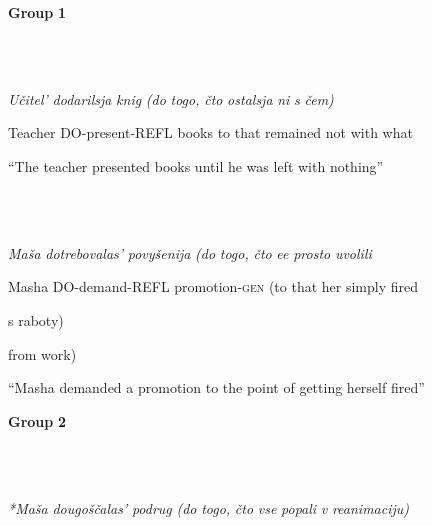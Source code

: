 \documentclass[output=paper,modfonts, nonflat]{langsci/langscibook}
\begin{document}
\textbf{Group} \textbf{1}

\begin{styleinnerExample}
\ea%
    \label{ex:key:29}
    \gll\\
        \\
    \glt
    \z

          \textit{Učitel’}  \textit{dodarilsja}               \textit{knig}   \textit{(do} \textit{togo,} \textit{čto} \textit{ostalsja}   \textit{ni}   \textit{s}      \textit{čem)}
\end{styleinnerExample}

\begin{styleinnerExample}
  Teacher DO-present-\textsc{REFL} books to  that         remained not with what
\end{styleinnerExample}

\begin{styleinnerExample}
  “The teacher presented books until he was left with nothing”
\end{styleinnerExample}

\begin{styleinnerExample}
\ea%
    \label{ex:key:30}
    \gll\\
        \\
    \glt
    \z

          \textit{Maša}   \textit{dotrebovalas’}          \textit{povyšenija}        \textit{(do} \textit{togo,} \textit{čto} \textit{ee} \textit{prosto} \textit{uvolili} 
\end{styleinnerExample}

\begin{styleinnerExample}
  Masha DO-demand-REFL promotion-\textsc{gen} (to  that          her simply fired 
\end{styleinnerExample}

\begin{styleinnerExample}
  s       raboty)
\end{styleinnerExample}

\begin{styleinnerExample}
  from work)
\end{styleinnerExample}

\begin{styleinnerExample}
  “Masha demanded a promotion to the point of getting herself fired” 
\end{styleinnerExample}

\textbf{Group} \textbf{2}

\begin{styleinnerExample}
\ea%
    \label{ex:key:31}
    \gll\\
        \\
    \glt
    \z

          \textit{*Maša}   \textit{dougoščalas’}     \textit{podrug} \textit{(do} \textit{togo,} \textit{čto} \textit{vse} \textit{popali} \textit{v}  \textit{reanimaciju)}
\end{styleinnerExample}
\end{document}
